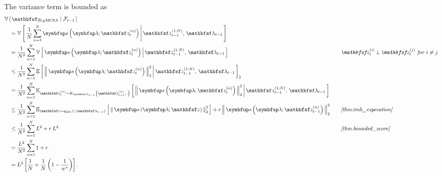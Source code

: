 \begin{proofEnd}
  The variance term is bounded as
  \begin{alignat}{2}
    &\V{ \rvvg_{t,\text{pMCSA}} \mid \mathcal{F}_{t-1}}
    \nonumber
    \\
    &\quad=
    \V{ \frac{1}{N}\sum^{N}_{n=1} \vs\left(\vlambda; \rvvz^{(n)}_t\right) \,\middle|\, \rvvz_{t-1}^{(1:N)},\, \rvvlambda_{t-1} }
    \nonumber
    \\
    &\quad=
    \frac{1}{N^2}\sum^{N}_{n=1} \V{ \vs\left(\vlambda; \rvvz^{(n)}_t\right) \,\middle|\, \rvvz_{t-1}^{(1:N)},\, \rvvlambda_{t-1} }
    &&\quad\text{\textit{\(\rvvz^{(i)}_t \,\bot\, \rvvz^{(j)}_t\) for \(i \neq j\)}}
    \nonumber
    \\
    &\quad\leq
    \frac{1}{N^2}\sum^{N}_{n=1} \E{ \norm{\vs\left(\vlambda; \rvvz^{(n)}_t\right) }^2_2 \,\middle|\, \rvvz_{t-1}^{(1:N)},\, \rvvlambda_{t-1} }_2
    \nonumber
    \\
    &\quad=
    \frac{1}{N^2}\sum^{N}_{n=1} \Esub{\rvvz^{(n)}_t \sim K_{\rvvlambda_{t-1}}\left(\rvvz_{t-1}^{(n)}, \cdot\right)}{ \norm{\vs\left(\vlambda; \rvvz^{(n)}_t\right) }^2_2 \,\middle|\,  \rvvz_{t-1}^{(1:N)},\, \rvvlambda_{t-1} }
    \nonumber
    \\
    &\quad\leq
    \frac{1}{N^2}\sum^{N}_{n=1}
      \Esub{\rvvz \sim q_{\text{def.}}\left(\cdot;\rvvlambda_{t-1}\right)}{ \norm{\vs\left(\vlambda; \rvvz \right)}^2_2 }
      +
      {r} \, \norm{\vs\left(\vlambda; \rvvz_{t-1}^{(n)} \right)}^2_2
    &&\quad\text{\textit{\cref{thm:imh_expecation}}}
    \nonumber
    \\
    &\quad\leq
    \frac{1}{N^2}\sum^{N}_{n=1}
        L^2 + {r} \, L^2
    &&\quad\text{\textit{\cref{thm:bounded_score}}}
    \nonumber
    \\
    &\quad=
    \frac{L^2}{N^2} \sum^{N}_{n=1}
      1 + {r}
    \nonumber
    \\
    &\quad=
    L^2 \left[ \frac{1}{N} + \frac{1}{N}\,{\left(1 - \frac{1}{w^*}\right)} \right].
    \nonumber
  \end{alignat}
\end{proofEnd}

